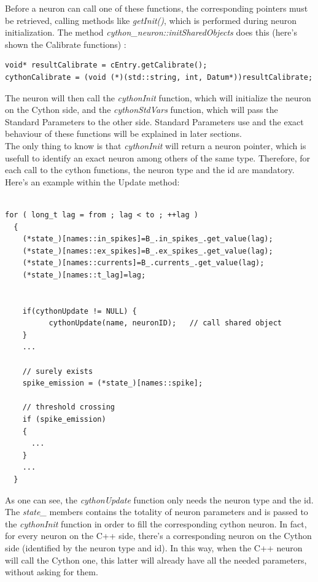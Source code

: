\documentclass{article}
\begin{document}
Before a neuron can call one of these functions, the corresponding pointers must be retrieved, calling methods like \emph{getInit()}, which is performed during neuron initialization. The method \emph{cython\_neuron::initSharedObjects} does this (here's shown the Calibrate functions) :
\begin{verbatim}
void* resultCalibrate = cEntry.getCalibrate();
cythonCalibrate = (void (*)(std::string, int, Datum*))resultCalibrate;
\end{verbatim}
The neuron will then call the \emph{cythonInit} function, which will initialize the neuron on the Cython side, and the \emph{cythonStdVars} function, which will pass the Standard Parameters to the other side. Standard Parameters use and the exact behaviour of these functions will be explained in later sections. \\
The only thing to know is that \emph{cythonInit} will return a neuron pointer, which is usefull to identify an exact neuron among others of the same type. Therefore, for each call to the cython functions, the neuron type and the id are mandatory. Here's an example within the Update method:\\ \\
\begin{verbatim}
for ( long_t lag = from ; lag < to ; ++lag )
  {
    (*state_)[names::in_spikes]=B_.in_spikes_.get_value(lag);
    (*state_)[names::ex_spikes]=B_.ex_spikes_.get_value(lag);
    (*state_)[names::currents]=B_.currents_.get_value(lag);
    (*state_)[names::t_lag]=lag;


    if(cythonUpdate != NULL) {
    	  cythonUpdate(name, neuronID);   // call shared object
    }
    ...

    // surely exists
    spike_emission = (*state_)[names::spike];

    // threshold crossing
    if (spike_emission)
    {
      ...
    }
    ...
  }
\end{verbatim}
As one can see, the \emph{cythonUpdate} function only needs the neuron type and the id. The \emph{state\_} members contains the totality of neuron parameters and is passed to the \emph{cythonInit} function in order to fill the corresponding cython neuron. In fact, for every neuron on the C++ side, there's a corresponding neuron on the Cython side (identified by the neuron type and id). In this way, when the C++ neuron will call the Cython one, this latter will already have all the needed parameters, without asking for them.
\end{document}
